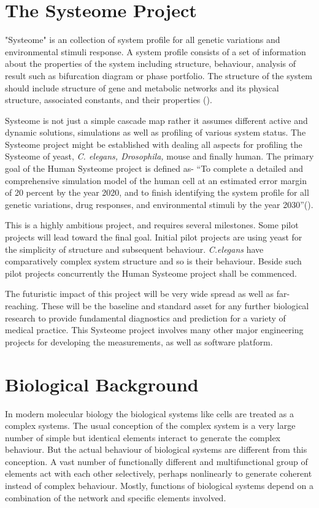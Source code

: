 \section{The Systeome Project}
"Systeome" is an collection of system profile for all genetic variations and environmental stimuli response. 
A system profile consists of a set of information about the properties of the system
including structure, behaviour, analysis of result such as bifurcation diagram or phase portfolio. The structure
of the system should include structure of gene and metabolic networks and its physical structure, associated constants,
and their properties (\cite{Kitano:2002}).

Systeome is not just a simple cascade map rather it assumes different active and dynamic solutions, simulations as
well as profiling of various system status. The Systeome project might be established with dealing all aspects for
profiling the Systeome of yeast, \textit{C. elegans, Drosophila,} mouse and finally human.
The primary goal of the Human Systeome project is defined as-
``To complete a detailed and comprehensive simulation model of the human cell at an estimated error margin of 
20 percent by the year 2020, and to finish identifying the system profile for all genetic variations, 
drug responses, and environmental stimuli by the year 2030''(\cite{Kitano:2002}).

This is a highly ambitious project, and requires several milestones. Some pilot projects will lead toward the final
goal. Initial pilot projects are using yeast for the simplicity of structure and subsequent behaviour.
\textit{C.elegans} have comparatively complex system structure and so is their behaviour. Beside such pilot projects
concurrently the Human Systeome project shall be commenced.

The futuristic impact of this project will be very wide spread as well as far-reaching. These will be the baseline
and standard asset for any further biological research to provide fundamental diagnostics and prediction for a variety
of medical practice. This Systeome project involves many other major engineering projects for developing the 
measurements, as well as software platform.

\section{Biological Background}
In modern molecular biology the biological systems like cells are treated as a complex systems.
The usual conception of the complex system is a very large number of simple but identical elements 
interact to generate the complex behaviour. But the actual behaviour of biological systems are 
different from this conception. A vast number of functionally different and multifunctional 
group of elements act with each other selectively, perhaps nonlinearly to generate coherent 
instead of complex behaviour. Mostly, functions of biological systems depend on a combination of 
the network and specific elements involved. 

